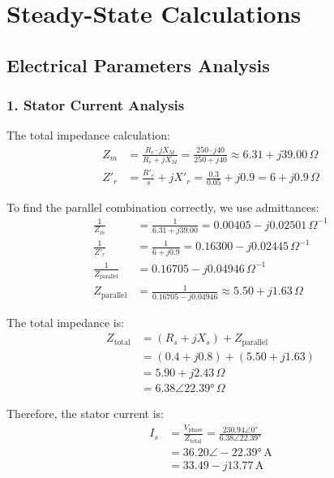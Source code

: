 \documentclass[a4paper,12pt]{IEEEtran}
\begin{document}
\section{Steady-State Calculations}
\label{sec:results}

\subsection{Electrical Parameters Analysis}

\subsubsection{1. Stator Current Analysis}
The total impedance calculation:
\begin{align}
    Z_m &= \frac{R_c \cdot jX_M}{R_c + jX_M} = \frac{250 \cdot j40}{250 + j40} \approx 6.31 + j39.00\,\Omega \\
    Z'_r &= \frac{R'_r}{s} + jX'_r = \frac{0.3}{0.05} + j0.9 = 6 + j0.9\,\Omega
\end{align}

To find the parallel combination correctly, we use admittances:
\begin{align}
    \frac{1}{Z_m} &= \frac{1}{6.31 + j39.00} = 0.00405 - j0.02501\,\Omega^{-1} \\
    \frac{1}{Z'_r} &= \frac{1}{6 + j0.9} = 0.16300 - j0.02445\,\Omega^{-1} \\
    \frac{1}{Z_{\text{parallel}}} &= 0.16705 - j0.04946\,\Omega^{-1} \\
    Z_{\text{parallel}} &= \frac{1}{0.16705 - j0.04946} \approx 5.50 + j1.63\,\Omega
\end{align}

The total impedance is:
\begin{align}
    Z_{\text{total}} &= (R_s + jX_s) + Z_{\text{parallel}} \\
    &= (0.4 + j0.8) + (5.50 + j1.63) \\
    &= 5.90 + j2.43\,\Omega \\
    &= 6.38\angle 22.39°\,\Omega
\end{align}

Therefore, the stator current is:
\begin{align}
    I_s &= \frac{V_{\text{phase}}}{Z_{\text{total}}} = \frac{230.94\angle 0°}{6.38\angle 22.39°} \\
    &= 36.20\angle -22.39°\,\text{A} \\
    &= 33.49 - j13.77\,\text{A}
\end{align}
\end{document}
